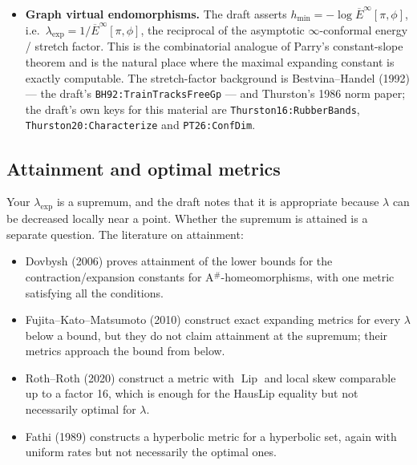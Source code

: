 \documentclass[
]{article}
\providecommand{\tightlist}{%
  \setlength{\itemsep}{0pt}\setlength{\parskip}{0pt}}
\begin{document}
\begin{itemize}
  \(\lambda=e^{h_{\mathrm{top}}/\mathrm{HD}(J)}\) in the conformal
  gauge, so \(\lambda_{\exp}\ge e^{h_{\mathrm{top}}/\mathrm{HD}(J)}\);
  the Ahlfors regular conformal dimension is the infimum of the
  dimensions of the gauge, and the maximal expansion exponent in the
  conformal gauge is \(\log d/\mathrm{ARCdim}\) for a cxc map of degree
  \(d\). The draft's companion paper on hyperbolic quadratic polynomials
  is the place where this is computed; I have not tried to reconcile its
  ``period of the attracting cycle'' statement with the conformal
  formula, since the two may use different normalizations.
\item
  \textbf{Graph virtual endomorphisms.} The draft asserts
  \(h_{\min}=-\log\overline E^\infty[\pi,\phi]\),
  i.e.~\(\lambda_{\exp}=1/\overline E^\infty[\pi,\phi]\), the reciprocal
  of the asymptotic \(\infty\)-conformal energy / stretch factor. This
  is the combinatorial analogue of Parry's constant-slope theorem and is
  the natural place where the maximal expanding constant is exactly
  computable. The stretch-factor background is Bestvina--Handel (1992)
  --- the draft's \texttt{BH92:TrainTracksFreeGp} --- and Thurston's
  1986 norm paper; the draft's own keys for this material are
  \texttt{Thurston16:RubberBands}, \texttt{Thurston20:Characterize} and
  \texttt{PT26:ConfDim}.
\end{itemize}

\subsection{Attainment and optimal
metrics}\label{attainment-and-optimal-metrics}

Your \(\lambda_{\exp}\) is a supremum, and the draft notes that it is
appropriate because \(\lambda\) can be decreased locally near a point.
Whether the supremum is attained is a separate question. The literature
on attainment:

\begin{itemize}
\tightlist
\item
  Dovbysh (2006) proves attainment of the lower bounds for the
  contraction/expansion constants for A$^{\#}$-homeomorphisms, with one
  metric satisfying all the conditions.
\item
  Fujita--Kato--Matsumoto (2010) construct exact expanding metrics for
  every \(\lambda\) below a bound, but they do not claim attainment at
  the supremum; their metrics approach the bound from below.
\item
  Roth--Roth (2020) construct a metric with \(\operatorname{Lip}\) and
  local skew comparable up to a factor 16, which is enough for the
  HausLip equality but not necessarily optimal for \(\lambda\).
\item
  Fathi (1989) constructs a hyperbolic metric for a hyperbolic set,
  again with uniform rates but not necessarily the optimal ones.
\end{itemize}
\end{document}
